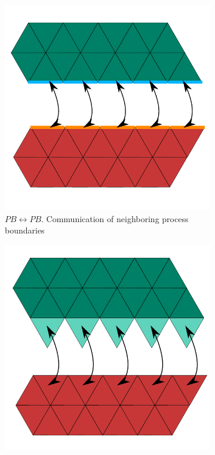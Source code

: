 \begin{figure}
    \centering
	\begin{subfigure}[b]{0.48\textwidth}
	  \includegraphics[scale=0.4]{images/parallel-comm-PBPB}
	  \captionsetup{width=0.8\textwidth} 
	  \caption{$PB \leftrightarrow PB$. Communication of neighboring process boundaries}
	\end{subfigure}
	\begin{subfigure}[b]{0.48\textwidth}
	  \includegraphics[scale=0.4]{images/parallel-comm-IG}

\end{subfigure}
\end{figure}
